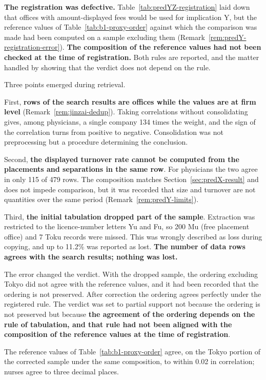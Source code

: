 \textbf{The registration was defective.} Table~\ref{tab:predYZ-registration} laid down that offices
with amount-displayed fees would be used for implication Y, but the reference values of
Table~\ref{tab:b1-proxy-order} against which the comparison was made had been computed on a sample
excluding them (Remark~\ref{rem:predY-registration-error}). \textbf{The composition of the
reference values had not been checked at the time of registration.} Both rules are reported, and
the matter handled by showing that the verdict does not depend on the rule.

Three points emerged during retrieval.

First, \textbf{rows of the search results are offices while the values are at firm level}
(Remark~\ref{rem:jinzai-dedup}). Taking correlations without consolidating gives, among
physicians, a single company 134 times the weight, and the sign of the correlation turns from
positive to negative. Consolidation was not preprocessing but a procedure determining the
conclusion.

Second, \textbf{the displayed turnover rate cannot be computed from the placements and separations
in the same row}. For physicians the two agree in only 115 of 479 rows. The composition matches
Section~\ref{sec:predX-result} and does not impede comparison, but it was recorded that size and
turnover are not quantities over the same period (Remark~\ref{rem:predY-limits}).

Third, \textbf{the initial tabulation dropped part of the sample}. Extraction was restricted to the
licence-number letters Yu and Fu, so 200 Mu (free placement office) and 7 Toku records were
missed. This was wrongly described as loss during copying, and up to 11.2\% was reported as lost.
\textbf{The number of data rows agrees with the search results; nothing was lost.}

The error changed the verdict. With the dropped sample, the ordering excluding Tokyo did not agree
with the reference values, and it had been recorded that the ordering is not preserved. After
correction the ordering agrees perfectly under the registered rule. The verdict was set to partial
support not because the ordering is not preserved but because \textbf{the agreement of the
ordering depends on the rule of tabulation, and that rule had not been aligned with the
composition of the reference values at the time of registration}.

The reference values of Table~\ref{tab:b1-proxy-order} agree, on the Tokyo portion of the corrected
sample under the same composition, to within 0.02 in correlation; nurses agree to three decimal
places.


